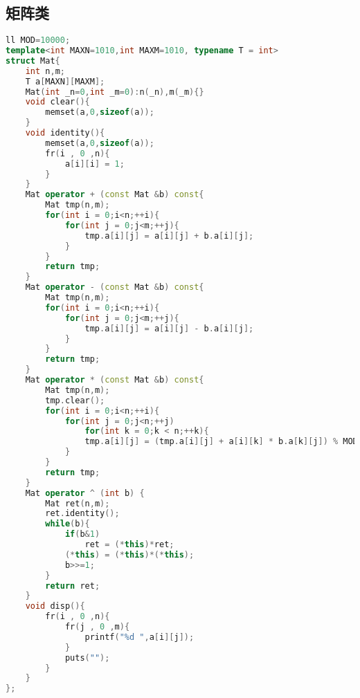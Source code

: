 \subsection{矩阵类}
		\begin{lstlisting}[language=c++]
ll MOD=10000;
template<int MAXN=1010,int MAXM=1010, typename T = int>
struct Mat{
    int n,m;
    T a[MAXN][MAXM];
    Mat(int _n=0,int _m=0):n(_n),m(_m){}
    void clear(){
        memset(a,0,sizeof(a));
    }
    void identity(){
        memset(a,0,sizeof(a));
        fr(i , 0 ,n){
            a[i][i] = 1;
        }
    }
    Mat operator + (const Mat &b) const{
        Mat tmp(n,m);
        for(int i = 0;i<n;++i){
            for(int j = 0;j<m;++j){
                tmp.a[i][j] = a[i][j] + b.a[i][j];
            }
        }
        return tmp;
    }
    Mat operator - (const Mat &b) const{
        Mat tmp(n,m);
        for(int i = 0;i<n;++i){
            for(int j = 0;j<m;++j){
                tmp.a[i][j] = a[i][j] - b.a[i][j];
            }
        }
        return tmp;
    }
    Mat operator * (const Mat &b) const{
        Mat tmp(n,m);
        tmp.clear();
        for(int i = 0;i<n;++i){
            for(int j = 0;j<n;++j)
                for(int k = 0;k < n;++k){
                tmp.a[i][j] = (tmp.a[i][j] + a[i][k] * b.a[k][j]) % MOD;
            }
        }
        return tmp;
    }
    Mat operator ^ (int b) {
        Mat ret(n,m);
        ret.identity();
        while(b){
            if(b&1)
                ret = (*this)*ret;
            (*this) = (*this)*(*this);
            b>>=1;
        }
        return ret;
    }
    void disp(){
        fr(i , 0 ,n){
            fr(j , 0 ,m){
                printf("%d ",a[i][j]);
            }
            puts("");
        }
    }
};
		\end{lstlisting}